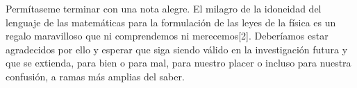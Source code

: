 \documentclass[a4paper, 12pt]{article}
\begin{document}
Permítaseme terminar con una nota alegre. El milagro de la idoneidad del lenguaje de las matemáticas para la formulación de las leyes de la física es un regalo maravilloso que ni comprendemos ni merecemos[2]. Deberíamos estar agradecidos por ello y esperar que siga siendo válido en la investigación futura y que se extienda, para bien o para mal, para nuestro placer o incluso para nuestra confusión, a ramas más amplias del saber.
\end{document}
